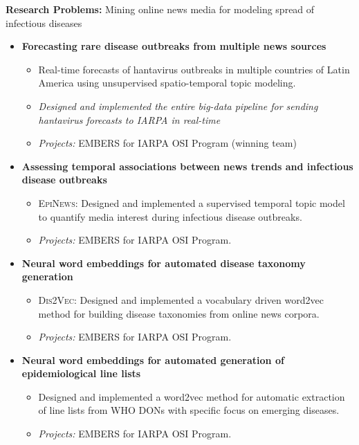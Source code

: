 \par{\textbf{Research Problems:} Mining online news media for modeling spread of infectious diseases\vspace{0.5em}
\begin{itemize}
 \item  \textbf{Forecasting rare disease outbreaks from multiple news sources}
   \begin{itemize}
     \item Real-time forecasts of hantavirus outbreaks in multiple countries of Latin America using unsupervised spatio-temporal topic modeling.
     \item \textit{Designed and implemented the entire big-data pipeline for sending hantavirus forecasts to IARPA in real-time}  
     \item \textit{Projects:} EMBERS for IARPA OSI Program (winning team)
   \end{itemize}\vspace{0.25em}
 \item \textbf{Assessing temporal associations between news trends and infectious disease outbreaks}
   \begin{itemize}
     \item {\textsc{EpiNews}}: Designed and implemented a supervised temporal topic model to quantify media interest during infectious disease outbreaks.
     \item \textit{Projects:} EMBERS for IARPA OSI Program.
   \end{itemize}\vspace{0.25em}
 \item \textbf{Neural word embeddings for automated disease taxonomy generation}
   \begin{itemize}
     \item {\textsc{Dis2Vec}}: Designed and implemented a vocabulary driven word2vec method for building disease taxonomies 
                               from online news corpora.
     \item \textit{Projects:} EMBERS for IARPA OSI Program.
   \end{itemize}
 \item \textbf{Neural word embeddings for automated generation of epidemiological line lists}
   \begin{itemize}
     \item Designed and implemented a word2vec method for automatic extraction of line lists from WHO DONs with specific focus on emerging diseases.
     \item \textit{Projects:} EMBERS for IARPA OSI Program.
   \end{itemize}
\end{itemize}
}
